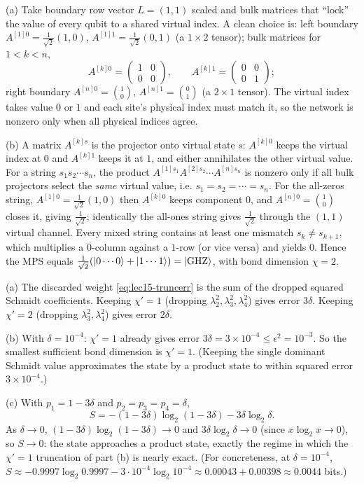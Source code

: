 \begin{solution}
(a) Take boundary row vector $L=(1,1)$ scaled and bulk matrices that ``lock'' the
value of every qubit to a shared virtual index. A clean choice is: left boundary
$A^{[1]0}=\tfrac1{\sqrt2}(1,0)$, $A^{[1]1}=\tfrac1{\sqrt2}(0,1)$ (a $1\times2$
tensor); bulk matrices for $1<k<n$,
\[
  A^{[k]0}=\begin{pmatrix}1&0\\0&0\end{pmatrix},\qquad
  A^{[k]1}=\begin{pmatrix}0&0\\0&1\end{pmatrix};
\]
right boundary $A^{[n]0}=\binom{1}{0}$, $A^{[n]1}=\binom{0}{1}$ (a $2\times1$
tensor). The virtual index takes value $0$ or $1$ and each site's physical index
must match it, so the network is nonzero only when all physical indices agree.

(b) A matrix $A^{[k]s}$ is the projector onto virtual state $s$: $A^{[k]0}$ keeps
the virtual index at $0$ and $A^{[k]1}$ keeps it at $1$, and either annihilates the
other virtual value. For a string $s_1 s_2\cdots s_n$, the product
$A^{[1]s_1}A^{[2]s_2}\cdots A^{[n]s_n}$ is nonzero only if all bulk projectors
select the \emph{same} virtual value, i.e. $s_1=s_2=\cdots=s_n$. For the all-zeros
string, $A^{[1]0}=\tfrac1{\sqrt2}(1,0)$ then $A^{[k]0}$ keeps component $0$, and
$A^{[n]0}=\binom10$ closes it, giving $\tfrac1{\sqrt2}$; identically the all-ones
string gives $\tfrac1{\sqrt2}$ through the $(1,1)$ virtual channel. Every mixed
string contains at least one mismatch $s_k\neq s_{k+1}$, which multiplies a
$0$-column against a $1$-row (or vice versa) and yields $0$. Hence the MPS equals
$\tfrac1{\sqrt2}(\ket{0\cdots0}+\ket{1\cdots1})=\ket{\mathrm{GHZ}}$, with bond
dimension $\chi=2$.
\end{solution}

\begin{solution}
(a) The discarded weight \eqref{eq:lec15-truncerr} is the sum of the dropped
squared Schmidt coefficients. Keeping $\chi'=1$ (dropping $\lambda_2^2,\lambda_3^2,
\lambda_4^2$) gives error $3\delta$. Keeping $\chi'=2$ (dropping $\lambda_3^2,
\lambda_4^2$) gives error $2\delta$.

(b) With $\delta=10^{-4}$: $\chi'=1$ already gives error $3\delta=3\times10^{-4}
\le\epsilon^{2}=10^{-3}$. So the smallest sufficient bond dimension is $\chi'=1$.
(Keeping the single dominant Schmidt value approximates the state by a product
state to within squared error $3\times10^{-4}$.)

(c) With $p_1=1-3\delta$ and $p_2=p_3=p_4=\delta$,
\[
  S=-(1-3\delta)\log_2(1-3\delta)-3\delta\log_2\delta .
\]
As $\delta\to0$, $(1-3\delta)\log_2(1-3\delta)\to0$ and $3\delta\log_2\delta\to0$
(since $x\log_2 x\to0$), so $S\to0$: the state approaches a product state, exactly
the regime in which the $\chi'=1$ truncation of part (b) is nearly exact. (For
concreteness, at $\delta=10^{-4}$, $S\approx-0.9997\log_2 0.9997
-3\cdot10^{-4}\log_2 10^{-4}\approx 0.00043+0.00398\approx0.0044$ bits.)
\end{solution}

